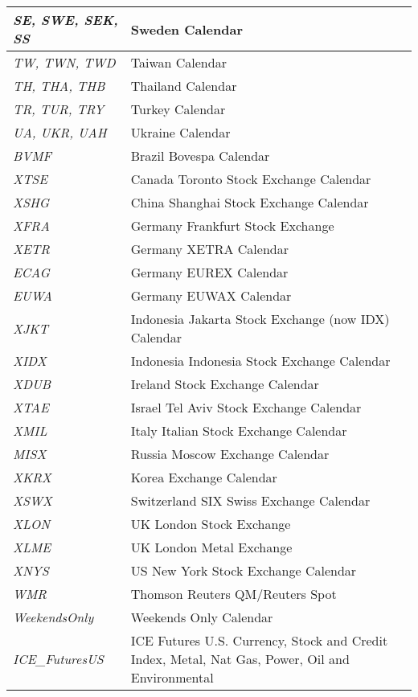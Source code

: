 \begin{longtable}{| p{} | p{} |}
    \emph{SE, SWE, SEK, SS} & Sweden Calendar \\ \hline        
    \emph{TW, TWN, TWD} & Taiwan Calendar \\ \hline
    \emph{TH, THA, THB} & Thailand Calendar \\ \hline
    \emph{TR, TUR, TRY} & Turkey Calendar \\ \hline
    \emph{UA, UKR, UAH} & Ukraine Calendar \\ \hline
    \emph{BVMF} & Brazil Bovespa Calendar \\ \hline
    \emph{XTSE} & Canada Toronto Stock Exchange Calendar \\ \hline
    \emph{XSHG} & China Shanghai Stock Exchange Calendar \\ \hline
    \emph{XFRA} & Germany Frankfurt Stock Exchange \\ \hline
    \emph{XETR} & Germany XETRA Calendar \\ \hline
    \emph{ECAG} & Germany EUREX Calendar \\ \hline
    \emph{EUWA} & Germany EUWAX Calendar \\ \hline
    \emph{XJKT} & Indonesia Jakarta Stock Exchange (now IDX) Calendar \\ \hline
    \emph{XIDX} & Indonesia Indonesia Stock Exchange Calendar \\ \hline
    \emph{XDUB} & Ireland Stock Exchange Calendar \\ \hline
    \emph{XTAE} & Israel Tel Aviv Stock Exchange Calendar \\ \hline
    \emph{XMIL} & Italy Italian Stock Exchange Calendar \\ \hline
    \emph{MISX} & Russia Moscow Exchange Calendar \\ \hline
    \emph{XKRX} & Korea Exchange Calendar \\ \hline
    \emph{XSWX} & Switzerland SIX Swiss Exchange Calendar \\ \hline
    \emph{XLON} & UK London Stock Exchange \\ \hline
    \emph{XLME} & UK London Metal Exchange \\ \hline
    \emph{XNYS} & US New York Stock Exchange Calendar \\ \hline
    \emph{WMR} & Thomson Reuters QM/Reuters Spot \\ \hline
    \emph{WeekendsOnly} & Weekends Only Calendar \\ \hline
    \emph{ICE\_FuturesUS} & ICE Futures U.S. Currency, Stock and Credit Index, Metal, Nat Gas, Power, Oil and Environmental \\ \hline

\end{longtable}
